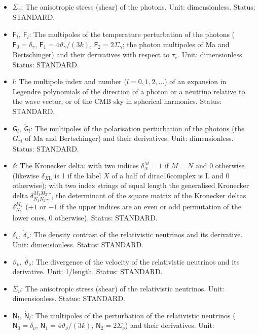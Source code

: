 \documentclass[
  10pt,
]{article}
\begin{document}
\begin{itemize}
  photons and its derivative. Unit: dimensionless. Status: STANDARD.
\item
  \(\Sigma_\gamma\): The anisotropic stress (shear) of the photons.
  Unit: dimensionless. Status: STANDARD.
\item
  \(\mathsf{F}_l,\ \dot{\mathsf{F}}_l\): The multipoles of the
  temperature perturbation of the photons
  (\(\mathsf{F}_0 = \delta_\gamma\),
  \(\mathsf{F}_1 = 4\vartheta_\gamma/(3k)\),
  \(\mathsf{F}_2 = 2\Sigma_\gamma\); the photon multipoles of Ma and
  Bertschinger) and their derivatives with respect to
  \(\tau_{\mathrm{c}}\). Unit: dimensionless. Status: STANDARD.
\item
  \(l\): The multipole index and number (\(l = 0, 1, 2, \dots\)) of an
  expansion in Legendre polynomials of the direction of a photon or a
  neutrino relative to the wave vector, or of the CMB sky in spherical
  harmonics. Status: STANDARD.
\item
  \(\mathsf{G}_l,\ \dot{\mathsf{G}}_l\): The multipoles of the
  polarisation perturbation of the photons (the \(G_{\gamma l}\) of Ma
  and Bertschinger) and their derivatives. Unit: dimensionless. Status:
  STANDARD.
\item
  \(\delta\): The Kronecker delta: with two indices \(\delta^M_N = 1\)
  if \(M = N\) and 0 otherwise (likewise \(\delta_{X\mathrm{L}}\) is 1
  if the label \(X\) of a half of dirac16complex is L and 0 otherwise);
  with two index strings of equal length the generalised Kronecker delta
  \(\delta^{M_1M_2\cdots}_{N_1N_2\cdots}\), the determinant of the
  square matrix of the Kronecker deltas \(\delta^{M_a}_{N_b}\) (\(+1\)
  or \(-1\) if the upper indices are an even or odd permutation of the
  lower ones, 0 otherwise). Status: STANDARD.
\item
  \(\delta_\nu,\ \dot\delta_\nu\): The density contrast of the
  relativistic neutrinos and its derivative. Unit: dimensionless.
  Status: STANDARD.
\item
  \(\vartheta_\nu,\ \dot\vartheta_\nu\): The divergence of the velocity
  of the relativistic neutrinos and its derivative. Unit: 1/length.
  Status: STANDARD.
\item
  \(\Sigma_\nu\): The anisotropic stress (shear) of the relativistic
  neutrinos. Unit: dimensionless. Status: STANDARD.
\item
  \(\mathsf{N}_l,\ \dot{\mathsf{N}}_l\): The multipoles of the
  perturbation of the relativistic neutrinos
  (\(\mathsf{N}_0 = \delta_\nu\),
  \(\mathsf{N}_1 = 4\vartheta_\nu/(3k)\),
  \(\mathsf{N}_2 = 2\Sigma_\nu\)) and their derivatives. Unit:

\end{itemize}
\end{document}
